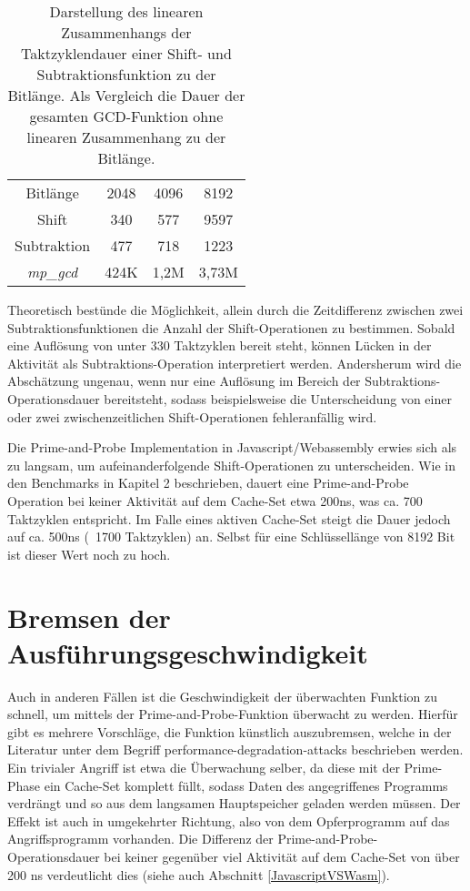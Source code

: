 \begin{table}[h]
\caption{Darstellung des linearen Zusammenhangs der Taktzyklendauer einer Shift- und Subtraktionsfunktion zu der Bitlänge. Als Vergleich die Dauer der gesamten GCD-Funktion ohne linearen Zusammenhang zu der Bitlänge.}
\label{tbl:ShiftSubCycles}
\begin{tabular}{c|ccc}
Bitlänge    & 2048 & 4096 & 8192 \\
Shift       & 340  & 577  & 9597 \\
Subtraktion & 477  & 718  & 1223 \\
\textit{mp_gcd}    & 424K & 1,2M & 3,73M
\end{tabular}
\end{table}

Theoretisch bestünde die Möglichkeit, allein durch die Zeitdifferenz zwischen zwei Subtraktionsfunktionen die Anzahl der Shift-Operationen zu bestimmen.
Sobald eine Auflösung von unter 330 Taktzyklen bereit steht, können Lücken in der Aktivität als Subtraktions-Operation interpretiert werden.
Andersherum wird die Abschätzung ungenau, wenn nur eine Auflösung im Bereich der Subtraktions-Operationsdauer bereitsteht, sodass beispielsweise die Unterscheidung von einer oder zwei zwischenzeitlichen Shift-Operationen fehleranfällig wird.

Die Prime-and-Probe Implementation in Javascript/Webassembly erwies sich als zu langsam, um aufeinanderfolgende Shift-Operationen zu unterscheiden.
Wie in den Benchmarks in Kapitel 2 beschrieben, dauert eine Prime-and-Probe Operation bei keiner Aktivität auf dem Cache-Set etwa 200ns, was ca. 700 Taktzyklen entspricht.
Im Falle eines aktiven Cache-Set steigt die Dauer jedoch auf ca. 500ns (~1700 Taktzyklen) an.
Selbst für eine Schlüssellänge von 8192 Bit ist dieser Wert noch zu hoch.

\section{Bremsen der Ausführungsgeschwindigkeit}
\label{PerformanceDegSingleThread}

Auch in anderen Fällen ist die Geschwindigkeit der überwachten Funktion zu schnell, um mittels der Prime-and-Probe-Funktion überwacht zu werden.
Hierfür gibt es mehrere Vorschläge, die Funktion künstlich auszubremsen, welche in der Literatur \cite{MemoryLockingWu,MemoryLockingRisenpart,MemoryLockingJavaAndroid} unter dem Begriff performance-degradation-attacks beschrieben werden.
Ein trivialer Angriff ist etwa die Überwachung selber, da diese mit der Prime-Phase ein Cache-Set komplett füllt, sodass Daten des angegriffenes Programms verdrängt und so aus dem langsamen Hauptspeicher geladen werden müssen.
Der Effekt ist auch in umgekehrter Richtung, also von dem Opferprogramm auf das Angriffsprogramm vorhanden.
Die Differenz der Prime-and-Probe-Operationsdauer bei keiner gegenüber viel Aktivität auf dem Cache-Set von über 200 ns verdeutlicht dies (siehe auch Abschnitt \ref{JavascriptVSWasm}).

